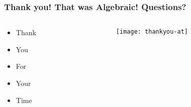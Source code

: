 \documentclass[aspectratio=169, 15pt,usenames,dvipsnames]{beamer}
\begin{document}
	\begin{gdblank}
		\frametitle{Thank you! That was Algebraic! Questions?}
		\begin{columns}			
			\begin{column}{0.5\textwidth}
				\begin{center}
				\begin{minipage}{.7\textwidth}		
				\LARGE
				\begin{itemize}
					\item Thank
					\item You 
					\item For
					\item Your
					\item Time
				\end{itemize}
			\end{minipage}
		\end{center}
			\end{column}
			\begin{column}{0.5\textwidth}				
				\texttt{[image: thankyou-at]}			
			\end{column}	
		\end{columns} 		
	\end{gdblank} 	
	\begin{gdthankyou}	
	\end{gdthankyou}
\end{document}
